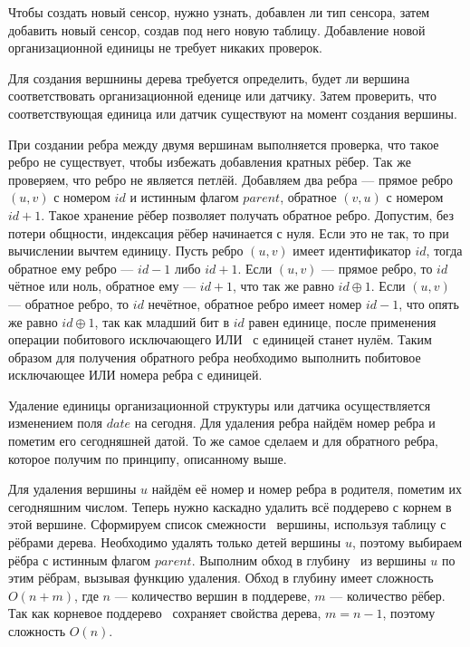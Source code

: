 Чтобы создать новый сенсор, нужно узнать, добавлен ли тип сенсора, затем добавить новый сенсор, создав под него новую таблицу. Добавление новой организационной единицы не требует никаких проверок.

Для создания вершнины дерева требуется определить, будет ли вершина соответствовать организационной еденице или датчику. Затем проверить, что соответствующая единица или датчик существуют на момент создания вершины.

При создании ребра между двумя вершинам выполняется проверка, что такое ребро не существует, чтобы избежать добавления кратных рёбер. Так же проверяем, что ребро не является петлёй. Добавляем два ребра --- прямое ребро $(u, v)$ с номером $id$ и истинным флагом $parent$, обратное $(v, u)$ с номером $id + 1$. Такое хранение рёбер позволяет получать обратное ребро. Допустим, без потери общности, индексация рёбер начинается с нуля. Если это не так, то при вычислении вычтем единицу. Пусть ребро $(u, v)$ имеет идентификатор $id$, тогда обратное ему ребро --- $id - 1$ либо $id + 1$. Если $(u, v)$ --- прямое ребро, то $id$ чётное или ноль, обратное ему --- $id + 1$, что так же равно $id \oplus 1$. Если $(u, v)$ --- обратное ребро, то $id$ нечётное, обратное ребро имеет номер $id - 1$, что опять же равно $id \oplus 1$, так как младший бит в $id$ равен единице, после применения операции побитового исключающего ИЛИ~\cite{XOR} с единицей станет нулём. Таким образом для получения обратного ребра необходимо выполнить побитовое исключающее ИЛИ номера ребра с единицей.

Удаление единицы организационной структуры или датчика осуществляется изменением поля $date$ на сегодня. Для удаления ребра найдём номер ребра и пометим его сегодняшней датой. То же самое сделаем и для обратного ребра, которое получим по принципу, описанному выше.

Для удаления вершины $u$ найдём её номер и номер ребра в родителя, пометим их сегодняшним числом. Теперь нужно каскадно удалить всё поддерево с корнем в этой вершине. Сформируем список смежности~\cite{graphs} вершины, используя таблицу с рёбрами дерева. Необходимо удалять только детей вершины $u$, поэтому выбираем рёбра с истинным флагом $parent$. Выполним обход в глубину~\cite{dfs1, dfs2} из вершины $u$ по этим рёбрам, вызывая функцию удаления. Обход в глубину имеет сложность $O(n + m)$, где $n$ --- количество вершин в поддереве, $m$ --- количество рёбер. Так как корневое поддерево~\cite{rooted-trees} сохраняет свойства дерева, $m = n - 1$, поэтому сложность $O(n)$.

